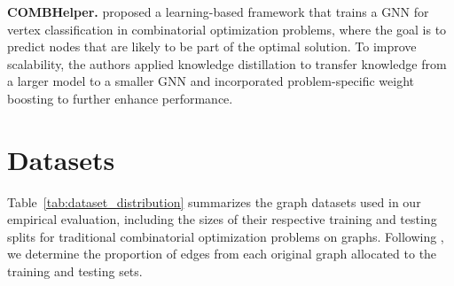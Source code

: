 
\textbf{COMBHelper.}  \citet{tian2024combhelper} proposed a learning-based framework that trains a GNN for vertex classification in combinatorial optimization problems, where the goal is to predict nodes that are likely to be part of the optimal solution. To improve scalability, the authors applied knowledge distillation to transfer knowledge from a larger model to a smaller GNN and incorporated problem-specific weight boosting to further enhance performance.







\section{Datasets}\label{appendix:dataset}





Table~\ref{tab:dataset_distribution} summarizes the graph datasets used in our empirical evaluation, including the sizes of their respective training and testing splits for traditional combinatorial optimization problems on graphs. Following \citet{ireland2022lense}, we determine the proportion of edges from each original graph allocated to the training and testing sets.



